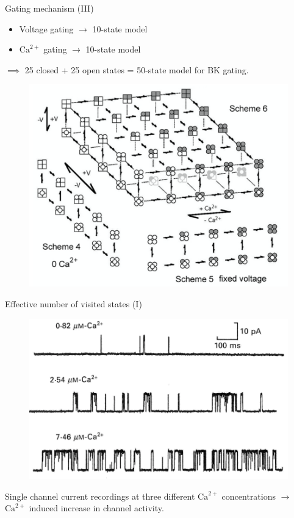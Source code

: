 \documentclass{beamer}
\newcommand{\ca}{\text{Ca}^{2+}}
\begin{document}
\begin{frame}{Gating mechanism (III)}
\begin{minipage}{.46\textwidth}
\begin{itemize}
	\item Voltage gating $\rightarrow$ 10-state model

	\item $\ca$ gating $\rightarrow$ 10-state model
\end{itemize}
\bigskip
$\implies$ 25 closed + 25 open states = 50-state model for BK gating.
\end{minipage}
\begin{minipage}{.52\textwidth}
\begin{figure}
\centering
\includegraphics[width=\textwidth]{50_State_Model.png}
\end{figure}
\end{minipage}
\end{frame}



\begin{frame}{Effective number of visited states (I)}
\begin{figure}
\centering
\includegraphics[width=.7\textwidth]{Ca_activation_v_vs_time.png}
\end{figure}

Single channel current recordings at three different $\ca$ concentrations $\rightarrow$ $\ca$ induced increase in channel activity.
\end{frame}
\end{document}
